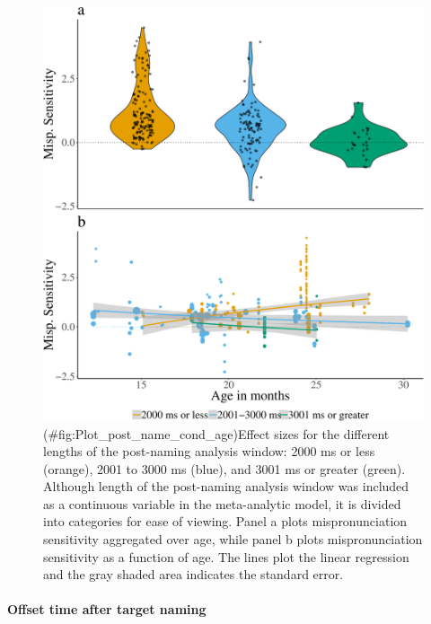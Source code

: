 \documentclass[man]{apa6}
\let\oldparagraph\paragraph
\renewcommand{\paragraph}[1]{\oldparagraph{#1}\mbox{}}
\theoremstyle{definition}
\theoremstyle{definition}
\theoremstyle{definition}
\theoremstyle{remark}
\begin{document}
\begin{figure}
\centering
\includegraphics{Paper_Analyses_files/figure-latex/Plot_post_name_cond_age-1.pdf}
\caption{(\#fig:Plot\_post\_name\_cond\_age)Effect sizes for the
different lengths of the post-naming analysis window: 2000 ms or less
(orange), 2001 to 3000 ms (blue), and 3001 ms or greater (green).
Although length of the post-naming analysis window was included as a
continuous variable in the meta-analytic model, it is divided into
categories for ease of viewing. Panel a plots mispronunciation
sensitivity aggregated over age, while panel b plots mispronunciation
sensitivity as a function of age. The lines plot the linear regression
and the gray shaded area indicates the standard error.}
\end{figure}

\paragraph{Offset time after target
naming}\label{offset-time-after-target-naming}
\end{document}
